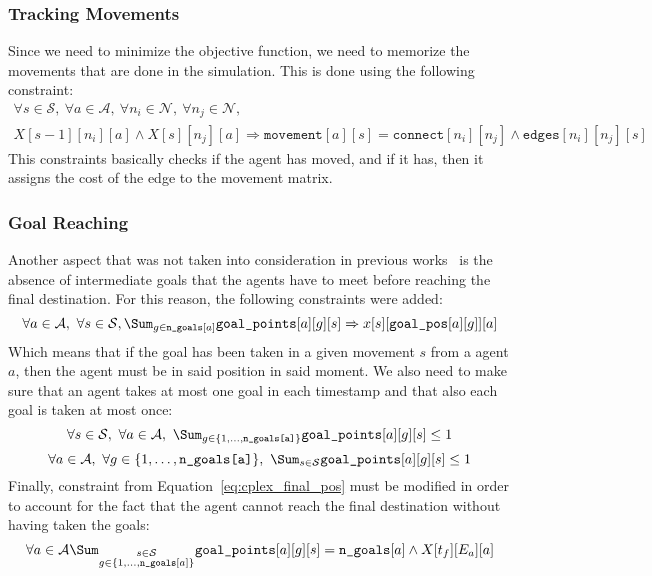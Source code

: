 \subsubsection{Tracking Movements}
Since we need to minimize the objective function, we need to memorize the
movements that are done in the simulation. This is done using the following 
constraint:
\begin{equation}
  \begin{array}{c}
    \forall s\in\mathcal{S},~\forall a\in\mathcal{A},~\forall
    n_i\in\mathcal{N},~\forall n_j\in\mathcal{N},\\
    X[s-1][n_i][a] \wedge X[s][n_j][a] \Rightarrow \texttt{movement}[a][s] = 
    \texttt{connect}[n_i][n_j] \wedge \texttt{edges}[n_i][n_j][s]
  \end{array}
  \label{eq:movement_track}
\end{equation}
This constraints basically checks if the agent has moved, and if it has, then
it assigns the cost of the edge to the movement matrix.
%
\subsubsection{Goal Reaching}
Another aspect that was not taken into consideration in previous
works~\cite{picat1, picat2} is the absence of intermediate goals that the
agents have to meet before reaching the final destination. For this reason, the
following constraints were added:
\begin{equation}
  \forall a \in \mathcal{A},~\forall s\in\mathcal{S},
  \Sum_{g\in\texttt{n\_goals}[a]} \texttt{goal\_points}[a][g][s] \Rightarrow
  x[s][\texttt{goal\_pos}[a][g]][a]
  \label{eq:take_goals}
\end{equation}
Which means that if the goal has been taken in a given movement $s$ from a
agent $a$, then the agent must be in said position in said moment. \newline
We also need to make sure that an agent takes at most one goal in each
timestamp and that also each goal is taken at most once:
\begin{equation}
  \forall s\in\mathcal{S},~\forall a \in\mathcal{A},~\Sum_{g\in
  \{1,\hdots,\texttt{n\_goals[a]}\}} \texttt{goal\_points}[a][g][s] \leq 1
  \label{eq:one_goal_one_step}
\end{equation}
\begin{equation}
  \forall a\in\mathcal{A},~\forall g \in\{1,\hdots,\texttt{n\_goals[a]}\}, 
  ~\Sum_{s\in \mathcal{S}} \texttt{goal\_points}[a][g][s] \leq 1
  \label{eq:one_goal_per_life}
\end{equation}
Finally, constraint from Equation~\ref{eq:cplex_final_pos} must be modified in
order to account for the fact that the agent cannot reach the final destination
without having taken the goals:
\begin{equation}
  \forall a\in\mathcal{A} 
  \Sum_{\substack{s\in\mathcal{S}\\g\in\{1,\hdots,\texttt{n\_goals}[a]\}}}
  \texttt{goal\_points}[a][g][s] = \texttt{n\_goals}[a] \wedge X[t_f][E_a][a]
  \label{eq:final_pos}
\end{equation}
%
%
